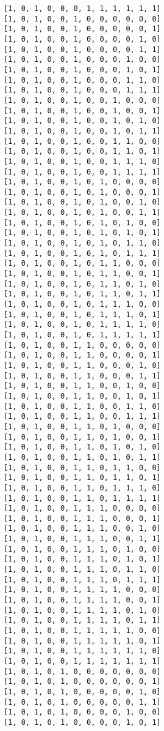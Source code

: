 \documentclass[11pt]{article}
\begin{document}
\begin{Verbatim}[commandchars=\\\{\}]
[1, 0, 1, 0, 0, 0, 1, 1, 1, 1, 1, 1]
[1, 0, 1, 0, 0, 1, 0, 0, 0, 0, 0, 0]
[1, 0, 1, 0, 0, 1, 0, 0, 0, 0, 0, 1]
[1, 0, 1, 0, 0, 1, 0, 0, 0, 0, 1, 0]
[1, 0, 1, 0, 0, 1, 0, 0, 0, 0, 1, 1]
[1, 0, 1, 0, 0, 1, 0, 0, 0, 1, 0, 0]
[1, 0, 1, 0, 0, 1, 0, 0, 0, 1, 0, 1]
[1, 0, 1, 0, 0, 1, 0, 0, 0, 1, 1, 0]
[1, 0, 1, 0, 0, 1, 0, 0, 0, 1, 1, 1]
[1, 0, 1, 0, 0, 1, 0, 0, 1, 0, 0, 0]
[1, 0, 1, 0, 0, 1, 0, 0, 1, 0, 0, 1]
[1, 0, 1, 0, 0, 1, 0, 0, 1, 0, 1, 0]
[1, 0, 1, 0, 0, 1, 0, 0, 1, 0, 1, 1]
[1, 0, 1, 0, 0, 1, 0, 0, 1, 1, 0, 0]
[1, 0, 1, 0, 0, 1, 0, 0, 1, 1, 0, 1]
[1, 0, 1, 0, 0, 1, 0, 0, 1, 1, 1, 0]
[1, 0, 1, 0, 0, 1, 0, 0, 1, 1, 1, 1]
[1, 0, 1, 0, 0, 1, 0, 1, 0, 0, 0, 0]
[1, 0, 1, 0, 0, 1, 0, 1, 0, 0, 0, 1]
[1, 0, 1, 0, 0, 1, 0, 1, 0, 0, 1, 0]
[1, 0, 1, 0, 0, 1, 0, 1, 0, 0, 1, 1]
[1, 0, 1, 0, 0, 1, 0, 1, 0, 1, 0, 0]
[1, 0, 1, 0, 0, 1, 0, 1, 0, 1, 0, 1]
[1, 0, 1, 0, 0, 1, 0, 1, 0, 1, 1, 0]
[1, 0, 1, 0, 0, 1, 0, 1, 0, 1, 1, 1]
[1, 0, 1, 0, 0, 1, 0, 1, 1, 0, 0, 0]
[1, 0, 1, 0, 0, 1, 0, 1, 1, 0, 0, 1]
[1, 0, 1, 0, 0, 1, 0, 1, 1, 0, 1, 0]
[1, 0, 1, 0, 0, 1, 0, 1, 1, 0, 1, 1]
[1, 0, 1, 0, 0, 1, 0, 1, 1, 1, 0, 0]
[1, 0, 1, 0, 0, 1, 0, 1, 1, 1, 0, 1]
[1, 0, 1, 0, 0, 1, 0, 1, 1, 1, 1, 0]
[1, 0, 1, 0, 0, 1, 0, 1, 1, 1, 1, 1]
[1, 0, 1, 0, 0, 1, 1, 0, 0, 0, 0, 0]
[1, 0, 1, 0, 0, 1, 1, 0, 0, 0, 0, 1]
[1, 0, 1, 0, 0, 1, 1, 0, 0, 0, 1, 0]
[1, 0, 1, 0, 0, 1, 1, 0, 0, 0, 1, 1]
[1, 0, 1, 0, 0, 1, 1, 0, 0, 1, 0, 0]
[1, 0, 1, 0, 0, 1, 1, 0, 0, 1, 0, 1]
[1, 0, 1, 0, 0, 1, 1, 0, 0, 1, 1, 0]
[1, 0, 1, 0, 0, 1, 1, 0, 0, 1, 1, 1]
[1, 0, 1, 0, 0, 1, 1, 0, 1, 0, 0, 0]
[1, 0, 1, 0, 0, 1, 1, 0, 1, 0, 0, 1]
[1, 0, 1, 0, 0, 1, 1, 0, 1, 0, 1, 0]
[1, 0, 1, 0, 0, 1, 1, 0, 1, 0, 1, 1]
[1, 0, 1, 0, 0, 1, 1, 0, 1, 1, 0, 0]
[1, 0, 1, 0, 0, 1, 1, 0, 1, 1, 0, 1]
[1, 0, 1, 0, 0, 1, 1, 0, 1, 1, 1, 0]
[1, 0, 1, 0, 0, 1, 1, 0, 1, 1, 1, 1]
[1, 0, 1, 0, 0, 1, 1, 1, 0, 0, 0, 0]
[1, 0, 1, 0, 0, 1, 1, 1, 0, 0, 0, 1]
[1, 0, 1, 0, 0, 1, 1, 1, 0, 0, 1, 0]
[1, 0, 1, 0, 0, 1, 1, 1, 0, 0, 1, 1]
[1, 0, 1, 0, 0, 1, 1, 1, 0, 1, 0, 0]
[1, 0, 1, 0, 0, 1, 1, 1, 0, 1, 0, 1]
[1, 0, 1, 0, 0, 1, 1, 1, 0, 1, 1, 0]
[1, 0, 1, 0, 0, 1, 1, 1, 0, 1, 1, 1]
[1, 0, 1, 0, 0, 1, 1, 1, 1, 0, 0, 0]
[1, 0, 1, 0, 0, 1, 1, 1, 1, 0, 0, 1]
[1, 0, 1, 0, 0, 1, 1, 1, 1, 0, 1, 0]
[1, 0, 1, 0, 0, 1, 1, 1, 1, 0, 1, 1]
[1, 0, 1, 0, 0, 1, 1, 1, 1, 1, 0, 0]
[1, 0, 1, 0, 0, 1, 1, 1, 1, 1, 0, 1]
[1, 0, 1, 0, 0, 1, 1, 1, 1, 1, 1, 0]
[1, 0, 1, 0, 0, 1, 1, 1, 1, 1, 1, 1]
[1, 0, 1, 0, 1, 0, 0, 0, 0, 0, 0, 0]
[1, 0, 1, 0, 1, 0, 0, 0, 0, 0, 0, 1]
[1, 0, 1, 0, 1, 0, 0, 0, 0, 0, 1, 0]
[1, 0, 1, 0, 1, 0, 0, 0, 0, 0, 1, 1]
[1, 0, 1, 0, 1, 0, 0, 0, 0, 1, 0, 0]
[1, 0, 1, 0, 1, 0, 0, 0, 0, 1, 0, 1]

\end{Verbatim}
\end{document}
